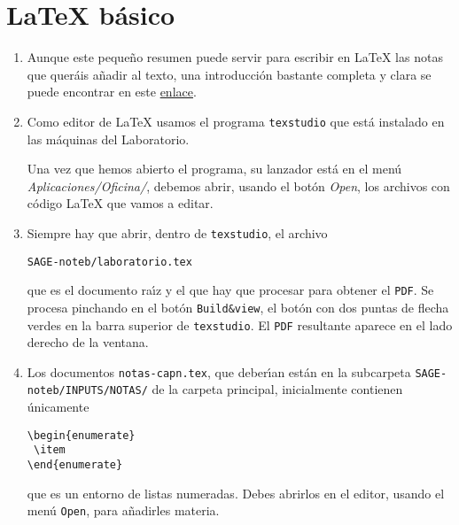 \begin{appendices}
\begin{enumerate}
\end{enumerate}


\chapter{{\LaTeX} b\'asico}\label{latex}

\begin{enumerate}
 
 \item Aunque este peque\~no resumen puede servir para escribir en {\LaTeX} las
notas que quer\'ais a\~nadir al texto, una introducci\'on bastante completa y
clara se puede encontrar en este 
 \href{http://150.244.21.37/PDFs/INTRO/ltxprimer-1.0.pdf}{enlace}.
 
 \item \label{TS}Como editor de {\LaTeX}  usamos el programa \verb|texstudio|
  que est\'a instalado en las m\'aquinas del Laboratorio. 
  
  Una vez que hemos abierto el programa, su lanzador est\'a en
el men\'u {\itshape Aplicaciones/Oficina/}, debemos abrir, usando el bot\'on
{\itshape Open}, los archivos con c\'odigo {\LaTeX} que vamos a editar.
  
  
  
  
  \item Siempre hay que abrir, dentro de \verb|texstudio|,  el archivo
\begin{center}
  \verb|SAGE-noteb/laboratorio.tex| 
 \end{center}
  
\noindent que es el documento ra\'{\i}z y el que hay que
procesar para obtener el \verb|PDF|. Se procesa pinchando en el bot\'on
\verb|Build&view|, el bot\'on con dos puntas de flecha verdes  en la barra superior de   \verb|texstudio|. El \verb|PDF| resultante aparece en el lado derecho de la ventana.  

\item Los documentos \verb|notas-capn.tex|, que deber\'{\i}an est\'an en la subcarpeta
\verb|SAGE-noteb/INPUTS/NOTAS/| de la carpeta principal, inicialmente contienen 
\'unicamente 
\begin{verbatim}
\begin{enumerate}
 \item 
\end{enumerate}
\end{verbatim}
\noindent que es un entorno de listas numeradas. Debes abrirlos en el editor,
usando el men\'u \verb|Open|, para a\~nadirles materia.


\end{enumerate}
\end{appendices}
